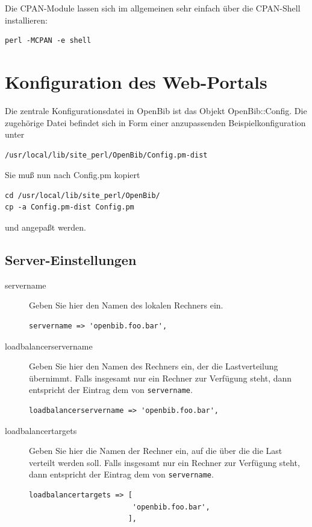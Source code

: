 \documentclass[11pt, twoside, a4paper, BCOR8mm, DIV12, bibtotoc,idxtotoc]{scrbook}
\begin{document}
Die CPAN-Module lassen sich im allgemeinen sehr einfach über die
CPAN-Shell installieren:

\begin{verbatim}
perl -MCPAN -e shell
\end{verbatim}

\section{Konfiguration des Web-Portals}
\label{sec:confportal}

Die zentrale Konfigurationsdatei in OpenBib ist das Objekt
OpenBib::Config. Die zugehörige Datei befindet sich in Form einer
anzupassenden Beispielkonfiguration unter 

\begin{verbatim}
/usr/local/lib/site_perl/OpenBib/Config.pm-dist
\end{verbatim}

Sie muß nun nach Config.pm kopiert 

\begin{verbatim}
cd /usr/local/lib/site_perl/OpenBib/
cp -a Config.pm-dist Config.pm
\end{verbatim}

und angepaßt werden.


\subsection{Server-Einstellungen}

\begin{description}
\item[servername] Geben Sie hier den Namen des lokalen Rechners
  ein. 
\begin{verbatim}
servername => 'openbib.foo.bar',
\end{verbatim}

\item[loadbalancerservername] Geben Sie hier den Namen des Rechners
  ein, der die Lastverteilung übernimmt. Falls insgesamt nur ein
  Rechner zur Verfügung steht, dann entspricht der Eintrag dem von
  \texttt{servername}.
\begin{verbatim}
loadbalancerservername => 'openbib.foo.bar',
\end{verbatim}

\item[loadbalancertargets] Geben Sie hier die Namen der Rechner ein,
  auf die über die die Last verteilt werden soll. Falls insgesamt nur
  ein Rechner zur Verfügung steht, dann entspricht der Eintrag dem
  von \texttt{servername}.
\begin{verbatim}
loadbalancertargets => [
                        'openbib.foo.bar',
                       ],
\end{verbatim}
\end{description}
\end{document}
